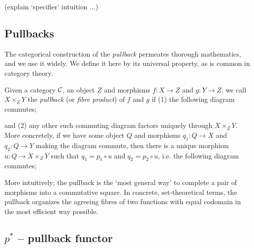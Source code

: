 (explain `specifier' intuition ...)

\subsection{Pullbacks}
The categorical construction of the \emph{pullback} permeates thorough mathematics, and we use it widely. We define it here by its universal property, as is common in category theory.

\begin{definition}[Pullback]
	Given a category $\mathcal{C}$, an object $Z$ and morphisms $f:X\to Z$ and $g:Y\to Z$, we call $X\times_{Z} Y$ the \emph{pullback} (or \emph{fibre product}) of $f$ and $g$ if (1) the following diagram commutes;

	\begin{figure}[!ht]
	\centering
	\end{figure}

	and (2) any other such commuting diagram factors uniquely through $X\times_Z Y$. More concretely, if we have some object $Q$ and morphisms $q_1:Q\to X$ and $q_2:Q\to Y$ making the diagram commute, then there is a unique morphism $u:Q\to X\times_Z Y$ such that $q_1 = p_1\circ u$ and $q_2 = p_2\circ u$, i.e. the following diagram commutes;

	\begin{figure}[!ht]
	\centering
	\end{figure}

\end{definition}

More intuitively; the pullback is the `most general way' to complete a pair of morphisms into a commutative square. In concrete, set-theoretical terms, the pullback organizes the agreeing fibres of two functions with equal codomain in the most efficient way possible.


\subsection{$p^*$ -- pullback functor}

